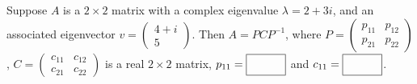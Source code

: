 \begin{parts}
    \ifnum {}
      Suppose $A$ is a $2\times2$ matrix with a complex eigenvalue $\lambda = 2+3i$, and an associated eigenvector $v=\begin{pmatrix} 4+i\\5\end{pmatrix}$. Then $A=PCP^{-1}$, where $P=\begin{pmatrix} p_{11}&p_{12}\\p_{21}&p_{22} \end{pmatrix}$, $C=\begin{pmatrix} c_{11}&c_{12}\\c_{21}&c_{22}\end{pmatrix}$ is a real $2\times 2$ matrix, $p_{11} = \framebox{\strut\hspace{1cm}}$ and $c_{11} = \framebox{\strut\hspace{1cm}}$.
      

\end{parts}
